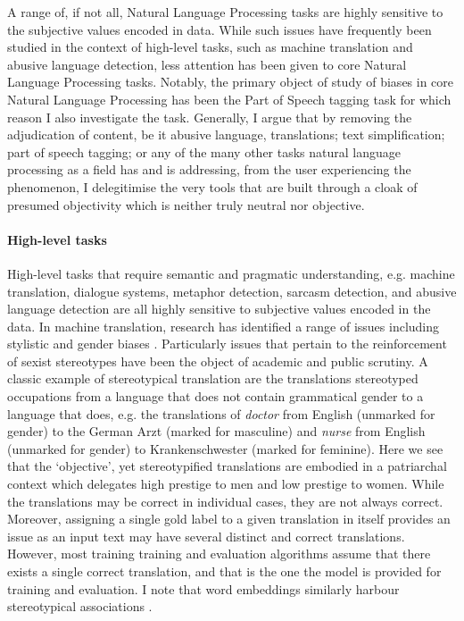 A range of, if not all, Natural Language Processing tasks are highly sensitive to the subjective values encoded in data. While such issues have frequently been studied in the context of high-level tasks, such as machine translation and abusive language detection, less attention has been given to core Natural Language Processing tasks. Notably, the primary object of study of biases in core Natural Language Processing has been the Part of Speech tagging task \citep{Blodgett:2016,Jorgensen:2016} for which reason I also investigate the task.
Generally, I argue that by removing the adjudication of content, be it abusive language, translations; text simplification; part of speech tagging; or any of the many other tasks natural language processing as a field has and is addressing, from the user experiencing the phenomenon, I delegitimise the very tools that are built through a cloak of presumed objectivity which is neither truly neutral nor objective.

\paragraph{High-level tasks} High-level tasks that require semantic and pragmatic understanding, e.g. machine translation, dialogue systems, metaphor detection, sarcasm detection, and abusive language detection are all highly sensitive to subjective values encoded in the data. In machine translation, research has identified a range of issues including stylistic \citep{Hovy:2020} and gender biases \citep{Vanmassenhove:2018}. Particularly issues that pertain to the reinforcement of sexist stereotypes have been the object of academic \citep{Zhao:2017} and public \citep{Locklear:2018} scrutiny. A classic example of stereotypical translation are the translations stereotyped occupations from a language that does not contain grammatical gender to a language that does, e.g. the translations of \textit{doctor} from English (unmarked for gender) to the German Arzt (marked for masculine) and \textit{nurse} from English (unmarked for gender) to Krankenschwester (marked for feminine). Here we see that the `objective', yet stereotypified translations are embodied in a patriarchal context which delegates high prestige to men and low prestige to women. While the translations may be correct in individual cases, they are not always correct. Moreover, assigning a single gold label to a given translation in itself provides an issue as an input text may have several distinct and correct translations. However, most training training and evaluation algorithms assume that there exists a single correct translation, and that is the one the model is provided for training and evaluation. I note that word embeddings similarly harbour stereotypical associations \citep{Bolukbasi:2016}.

